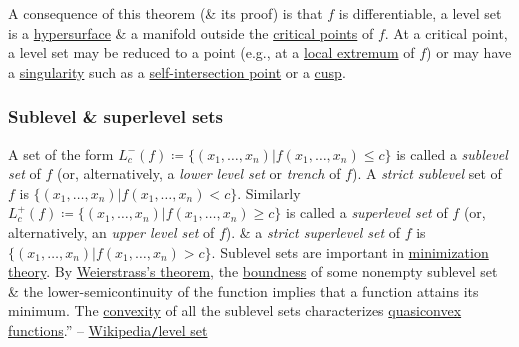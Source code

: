 \documentclass{article}
\begin{document}
A consequence of this theorem (\& its proof) is that $f$ is differentiable, a level set is a \href{https://en.wikipedia.org/wiki/Hypersurface}{hypersurface} \& a manifold outside the \href{https://en.wikipedia.org/wiki/Critical_point_(mathematics)}{critical points} of $f$. At a critical point, a level set may be reduced to a point (e.g., at a \href{https://en.wikipedia.org/wiki/Local_extremum}{local extremum} of $f$) or may have a \href{https://en.wikipedia.org/wiki/Singular_point_of_an_algebraic_variety}{singularity} such as a \href{https://en.wikipedia.org/wiki/Intersection_theory}{self-intersection point} or a \href{https://en.wikipedia.org/wiki/Cusp_(singularity)}{cusp}.

\subsubsection{Sublevel \& superlevel sets}
A set of the form $L_c^-(f)\coloneqq\{(x_1,\ldots,x_n)|f(x_1,\ldots,x_n)\le c\}$ is called a {\it sublevel set} of $f$ (or, alternatively, a {\it lower level set} or {\it trench} of $f$). A {\it strict sublevel} set of $f$ is $\{(x_1,\ldots,x_n)|f(x_1,\ldots,x_n) < c\}$. Similarly $L_c^+(f)\coloneqq\{(x_1,\ldots,x_n)|f(x_1,\ldots,x_n)\ge c\}$ is called a {\it superlevel set} of $f$ (or, alternatively, an {\it upper level set} of $f$). \& a {\it strict superlevel set} of $f$ is $\{(x_1,\ldots,x_n)|f(x_1,\ldots,x_n) > c\}$. Sublevel sets are important in \href{https://en.wikipedia.org/wiki/Mathematical_optimization}{minimization theory}. By \href{https://en.wikipedia.org/wiki/Extreme_value_theorem#Extension_to_semi-continuous_functions}{Weierstrass's theorem}, the \href{https://en.wikipedia.org/wiki/Totally_bounded_set}{boundness} of some nonempty sublevel set \& the lower-semicontinuity of the function implies that a function attains its minimum. The \href{https://en.wikipedia.org/wiki/Convex_set}{convexity} of all the sublevel sets characterizes \href{https://en.wikipedia.org/wiki/Quasiconvex_function}{quasiconvex functions}.'' -- \href{https://en.wikipedia.org/wiki/Level_set}{Wikipedia{\tt/}level set}

\end{document}
